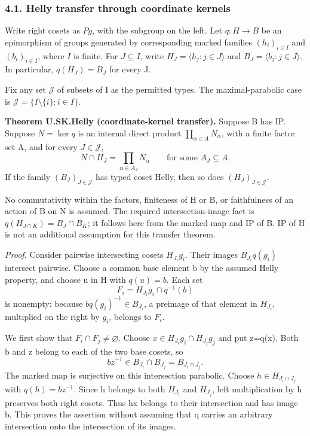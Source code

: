 \documentclass[
  11pt,
  a4paper,
]{article}
\newcounter{none} %
\begin{document}
\subsubsection{4.1. Helly transfer through coordinate
kernels}\label{helly-transfer-through-coordinate-kernels}

Write right cosets as \(P g\), with the subgroup on the left. Let
\(q:H\to B\) be an epimorphism of groups generated by corresponding
marked families \((h_i)_{i\in I}\) and \((b_i)_{i\in I}\), where \(I\)
is finite. For \(J\subseteq I\), write \(H_J=\langle h_j:j\in J\rangle\)
and \(B_J=\langle b_j:j\in J\rangle\). In particular, \(q(H_J)=B_J\) for
every J.

Fix any set \(\mathcal J\) of subsets of I as the permitted types. The
maximal-parabolic case is \(\mathcal J=\{I\setminus\{i\}:i\in I\}\).

\textbf{Theorem U.SK.Helly (coordinate-kernel transfer).} Suppose B has
IP. Suppose \(N=\ker q\) is an internal direct product
\(\prod_{\alpha\in A}N_\alpha\), with a finite factor set A, and for
every \(J\in\mathcal J\), \[
 N\cap H_J=\prod_{\alpha\in A_J}N_\alpha
 \qquad\text{for some }A_J\subseteq A.
 \tag{4.6}
\] If the family \((B_J)_{J\in\mathcal J}\) has typed coset Helly, then
so does \((H_J)_{J\in\mathcal J}\).

No commutativity within the factors, finiteness of H or B, or
faithfulness of an action of B on N is assumed. The required
intersection-image fact is \(q(H_{J\cap K})=B_J\cap B_K\); it follows
here from the marked map and IP of B. IP of H is not an additional
assumption for this transfer theorem.

\emph{Proof.} Consider pairwise intersecting cosets \(H_{J_i}g_i\).
Their images \(B_{J_i}q(g_i)\) intersect pairwise. Choose a common base
element b by the assumed Helly property, and choose u in H with
\(q(u)=b\). Each set \[
 F_i=H_{J_i}g_i\cap q^{-1}(b)
\] is nonempty: because \(bq(g_i)^{-1}\in B_{J_i}\), a preimage of that
element in \(H_{J_i}\), multiplied on the right by \(g_i\), belongs to
\(F_i\).

We first show that \(F_i\cap F_j\ne\varnothing\). Choose
\(x\in H_{J_i}g_i\cap H_{J_j}g_j\) and put z=q(x). Both b and z belong
to each of the two base cosets, so \[
 bz^{-1}\in B_{J_i}\cap B_{J_j}=B_{J_i\cap J_j}.
\] The marked map is surjective on this intersection parabolic. Choose
\(h\in H_{J_i\cap J_j}\) with \(q(h)=bz^{-1}\). Since h belongs to both
\(H_{J_i}\) and \(H_{J_j}\), left multiplication by h preserves both
right cosets. Thus hx belongs to their intersection and has image b.
This proves the assertion without assuming that q carries an arbitrary
intersection onto the intersection of its images.
\end{document}
